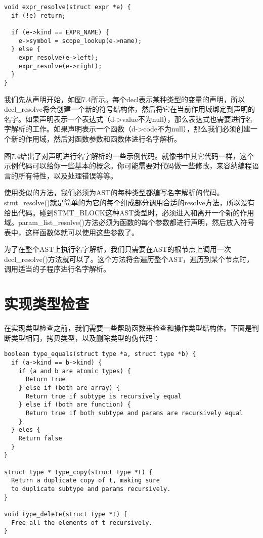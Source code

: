 \documentclass[cn,11pt,chinese]{elegantbook}
\begin{document}
\begin{verbatim}
void expr_resolve(struct expr *e) {
  if (!e) return;
    
  if (e->kind == EXPR_NAME) {
    e->symbol = scope_lookup(e->name);
  } else {
    expr_resolve(e->left);
    expr_resolve(e->right);
  }
}
\end{verbatim}

我们先从声明开始，如图7.4所示。每个decl表示某种类型的变量的声明，所以decl\_resolve将会创建一个新的符号结构体，然后将它在当前作用域绑定到声明的名字。如果声明表示一个表达式（d->value不为null），那么表达式也需要进行名字解析的工作。如果声明表示一个函数（d->code不为null），那么我们必须创建一个新的作用域，然后对函数参数和函数体进行名字解析。

图7.4给出了对声明进行名字解析的一些示例代码。就像书中其它代码一样，这个示例代码可以给你一些基本的概念。你可能需要对代码做一些修改，来容纳编程语言的所有特性，以及处理错误等等。

使用类似的方法，我们必须为AST的每种类型都编写名字解析的代码。stmt\_resolve()就是简单的为它的每个组成部分调用合适的resolve方法，所以没有给出代码。碰到STMT\_BLOCK这种AST类型时，必须进入和离开一个新的作用域。param\_list\_resolve()方法必须为函数的每个参数都进行声明，然后放入符号表中，这样函数体就可以使用这些参数了。

为了在整个AST上执行名字解析，我们只需要在AST的根节点上调用一次decl\_resolve()方法就可以了。这个方法将会遍历整个AST，遍历到某个节点时，调用适当的子程序进行名字解析。

\section{实现类型检查}

在实现类型检查之前，我们需要一些帮助函数来检查和操作类型结构体。下面是判断类型相同，拷贝类型，以及删除类型的伪代码：

\begin{verbatim}
boolean type_equals(struct type *a, struct type *b) {
  if (a->kind == b->kind) {
    if (a and b are atomic types) {
      Return true
    } else if (both are array) {
      Return true if subtype is recursively equal
    } else if (both are function) {
      Return true if both subtype and params are recursively equal
    }
  } eles {
    Return false
  }
}

struct type * type_copy(struct type *t) {
  Return a duplicate copy of t, making sure
  to duplicate subtype and params recursively.
}

void type_delete(struct type *t) {
  Free all the elements of t recursively.
}
\end{verbatim}
\end{document}
